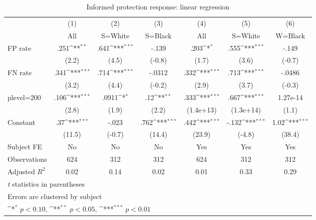 \begin{table}[htbp]\centering
\def\sym#1{\ifmmode^{#1}\else\(^{#1}\)\fi}
\caption{Informed protection response: linear regression}
\begin{tabular}{l*{6}{c}}
\hline\hline
                &\multicolumn{1}{c}{(1)}&\multicolumn{1}{c}{(2)}&\multicolumn{1}{c}{(3)}&\multicolumn{1}{c}{(4)}&\multicolumn{1}{c}{(5)}&\multicolumn{1}{c}{(6)}\\
                &\multicolumn{1}{c}{All}&\multicolumn{1}{c}{S=White}&\multicolumn{1}{c}{S=Black}&\multicolumn{1}{c}{All}&\multicolumn{1}{c}{S=White}&\multicolumn{1}{c}{W=Black}\\
\hline
FP rate         &     .251\sym{**} &     .641\sym{***}&    -.139         &     .203\sym{*}  &     .555\sym{***}&    -.149         \\
                &    (2.2)         &    (4.5)         &   (-0.8)         &    (1.7)         &    (3.6)         &   (-0.7)         \\
FN rate         &     .341\sym{***}&     .714\sym{***}&   -.0312         &     .332\sym{***}&     .713\sym{***}&   -.0486         \\
                &    (3.2)         &    (4.4)         &   (-0.2)         &    (2.9)         &    (3.7)         &   (-0.3)         \\
plevel=200      &     .106\sym{***}&    .0911\sym{*}  &      .12\sym{**} &     .333\sym{***}&     .667\sym{***}& 1.27e-14         \\
                &    (2.8)         &    (1.9)         &    (2.2)         &(1.4e+13)         &(1.3e+14)         &    (1.1)         \\
Constant        &      .37\sym{***}&    -.023         &     .762\sym{***}&     .442\sym{***}&    -.132\sym{***}&     1.02\sym{***}\\
                &   (11.5)         &   (-0.7)         &   (14.4)         &   (23.9)         &   (-4.8)         &   (38.4)         \\
Subject FE      &       No         &       No         &       No         &      Yes         &      Yes         &      Yes         \\
\hline
Observations    &      624         &      312         &      312         &      624         &      312         &      312         \\
Adjusted \(R^{2}\)&     0.02         &     0.14         &     0.02         &     0.01         &     0.33         &     0.29         \\
\hline\hline
\multicolumn{7}{l}{\footnotesize \textit{t} statistics in parentheses}\\
\multicolumn{7}{l}{\footnotesize Errors are clustered by subject}\\
\multicolumn{7}{l}{\footnotesize \sym{*} \(p<0.10\), \sym{**} \(p<0.05\), \sym{***} \(p<0.01\)}\\
\end{tabular}
\end{table}
